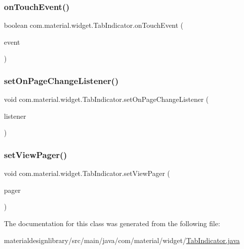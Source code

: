\subsubsection{\texorpdfstring{on\+Touch\+Event()}{onTouchEvent()}}
{\footnotesize\ttfamily boolean com.\+material.\+widget.\+Tab\+Indicator.\+on\+Touch\+Event (\begin{DoxyParamCaption}\item[{@Non\+Null Motion\+Event}]{event }\end{DoxyParamCaption})}

\mbox{\label{classcom_1_1material_1_1widget_1_1_tab_indicator_ac80a190723de5eef481d67212a6a258a}} 
\subsubsection{\texorpdfstring{set\+On\+Page\+Change\+Listener()}{setOnPageChangeListener()}}
{\footnotesize\ttfamily void com.\+material.\+widget.\+Tab\+Indicator.\+set\+On\+Page\+Change\+Listener (\begin{DoxyParamCaption}\item[{On\+Page\+Change\+Listener}]{listener }\end{DoxyParamCaption})}

\mbox{\label{classcom_1_1material_1_1widget_1_1_tab_indicator_af53aabaef2e37516116aca5ef5a4b345}} 
\subsubsection{\texorpdfstring{set\+View\+Pager()}{setViewPager()}}
{\footnotesize\ttfamily void com.\+material.\+widget.\+Tab\+Indicator.\+set\+View\+Pager (\begin{DoxyParamCaption}\item[{View\+Pager}]{pager }\end{DoxyParamCaption})}



The documentation for this class was generated from the following file\+:\begin{DoxyCompactItemize}
\item 
materialdesignlibrary/src/main/java/com/material/widget/\hyperlink{_tab_indicator_8java}{Tab\+Indicator.\+java}\end{DoxyCompactItemize}
